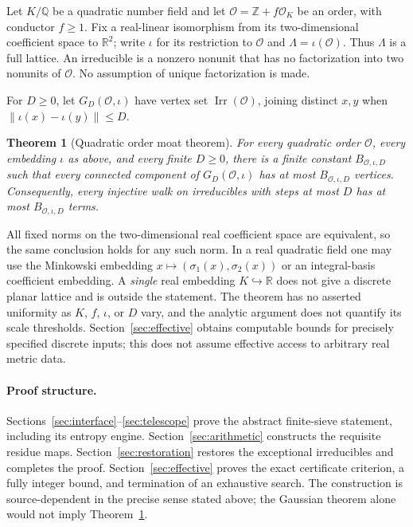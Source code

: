 \documentclass[11pt]{article}
\numberwithin{equation}{section}
\newtheorem{theorem}{Theorem}[section]
\theoremstyle{definition}\newtheorem{definition}[theorem]{Definition}
\theoremstyle{remark}\newtheorem{remark}[theorem]{Remark}
\newcommand{\Z}{\mathbb Z}\newcommand{\Q}{\mathbb Q}\newcommand{\R}{\mathbb R}
\newcommand{\OO}{\mathcal O}\newcommand{\PP}{\mathcal P}
\newcommand{\norm}[1]{\lVert #1\rVert}
\newcommand{\Irr}{\operatorname{Irr}}
\begin{document}
Let $K/\Q$ be a quadratic number field and let $\OO=\Z+f\OO_K$ be an order, with conductor $f\ge1$. Fix a real-linear isomorphism from its two-dimensional coefficient space to $\R^2$; write $\iota$ for its restriction to $\OO$ and $\Lambda=\iota(\OO)$. Thus $\Lambda$ is a full lattice. An irreducible is a nonzero nonunit that has no factorization into two nonunits of $\OO$. No assumption of unique factorization is made.

For $D\ge0$, let $G_D(\OO,\iota)$ have vertex set $\Irr(\OO)$, joining distinct $x,y$ when $\norm{\iota(x)-\iota(y)}\le D$.

\begin{theorem}[Quadratic order moat theorem]\label{thm:main}
For every quadratic order $\OO$, every embedding $\iota$ as above, and every finite $D\ge0$, there is a finite constant $B_{\OO,\iota,D}$ such that every connected component of $G_D(\OO,\iota)$ has at most $B_{\OO,\iota,D}$ vertices. Consequently, every injective walk on irreducibles with steps at most $D$ has at most $B_{\OO,\iota,D}$ terms.
\end{theorem}

All fixed norms on the two-dimensional real coefficient space are equivalent, so the same conclusion holds for any such norm. In a real quadratic field one may use the Minkowski embedding $x\mapsto(\sigma_1(x),\sigma_2(x))$ or an integral-basis coefficient embedding. A \emph{single} real embedding $K\hookrightarrow\R$ does not give a discrete planar lattice and is outside the statement. The theorem has no asserted uniformity as $K$, $f$, $\iota$, or $D$ vary, and the analytic argument does not quantify its scale thresholds. Section~\ref{sec:effective} obtains computable bounds for precisely specified discrete inputs; this does not assume effective access to arbitrary real metric data.

\paragraph{Proof structure.}
Sections~\ref{sec:interface}--\ref{sec:telescope} prove the abstract finite-sieve statement, including its entropy engine. Section~\ref{sec:arithmetic} constructs the requisite residue maps. Section~\ref{sec:restoration} restores the exceptional irreducibles and completes the proof. Section~\ref{sec:effective} proves the exact certificate criterion, a fully integer bound, and termination of an exhaustive search. The construction is source-dependent in the precise sense stated above; the Gaussian theorem alone would not imply Theorem~\ref{thm:main}.
\end{document}
